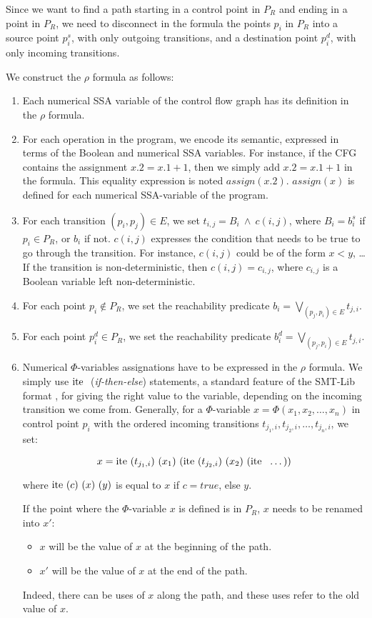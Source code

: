 \documentclass[a4paper,english,titlepage,11pt]{report}
\def\ite{\textnormal{ite\ }}
\begin{document}
	Since we want to find a path starting in a control point in $P_R$ and ending
	in a point in $P_R$, we need to disconnect in the formula the points $p_i$
	in $P_R$ into a source point $p_i^s$, with only outgoing transitions, and a
	destination point $p_i^d$, with only incoming transitions. 

	We construct the $\rho$ formula as follows:

\begin{enumerate}
\item Each numerical SSA variable of the control flow graph has its definition
in the $\rho$ formula.
\item For each operation in the program, we encode its semantic, expressed in
terms of the Boolean and numerical SSA variables. For instance, if the CFG
contains the assignment $x.2 = x.1 + 1$, then we simply add $x.2 = x.1 + 1$ in
the formula. This equality expression is noted $assign(x.2)$. 
$assign(x)$ is defined for each numerical SSA-variable of the program.
\item For each transition $(p_i,p_j) \in E$, we set $t_{i,j} = B_i\ \wedge \
c(i,j)$, where $B_i = b_i^s$ if $p_i \in P_R$, or $b_i$ if not.
$c(i,j)$ expresses the condition that needs to be true to go through the
transition. For instance, $c(i,j)$ could be of the form $x < y$, \dots
If the transition is non-deterministic, then $c(i,j) = c_{i,j}$, where
$c_{i,j}$ is a Boolean variable left non-deterministic.
\item For each point $p_i \notin P_R$, we set the reachability predicate 
$b_i = \displaystyle \bigvee_{(p_j,p_i)\in E} t_{j,i}$.
\item For each point $p_i^d \in P_R$, we set the reachability predicate 
$b_i^d = \displaystyle \bigvee_{(p_j,p_i)\in E} t_{j,i}$. 
\item Numerical $\Phi$-variables assignations have to be expressed in the $\rho$
formula. We simply use $\ite$ (\emph{if-then-else}) statements, a standard feature of the
SMT-Lib format \cite{BarST-SMTLIB}, for giving the right value to the variable,
depending on the incoming transition we come from. Generally, for a
$\Phi$-variable $x = \Phi(x_1,x_2,\dots,x_n)$ in control point $p_i$ with the
ordered incoming transitions $t_{j_1,i},t_{j_2,i},\dots,t_{j_n,i}$, we set:

$$x = \ite (t_{j_1,i})\  (x_1)\  (\ite (t_{j_2,i})\  (x_2)\  (\ite\  \dots))$$

where $\ite (c)\ (x)\ (y)$ is equal to $x$ if $c = true$, else $y$.

If the point where the $\Phi$-variable $x$ is defined is in
$P_R$, $x$ needs to be renamed into $x'$:
\begin{itemize}
\item $x$ will be the value of $x$ at the beginning of the path.
\item $x'$ will be the value of $x$ at the end of the path.
\end{itemize}
Indeed, there can be uses of $x$ along the path, and these uses refer to the
old value of $x$. 
\end{enumerate}
\end{document}
